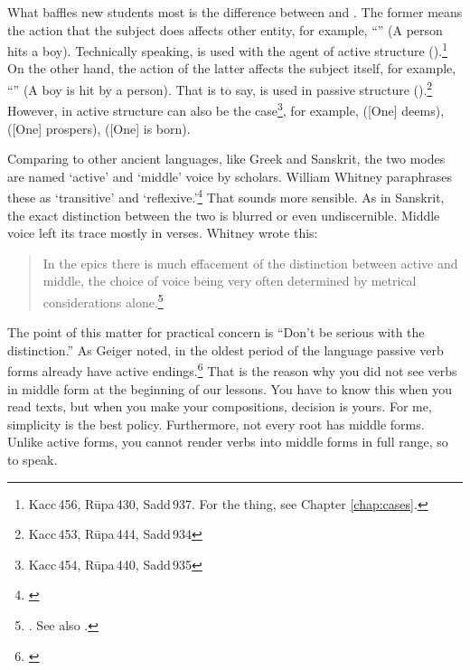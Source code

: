 What baffles new students most is the difference between  and . The former means the action that the subject does affects other entity, for example, ``'' (A person hits a boy). Technically speaking,  is used with the agent of active structure ().\footnote{Kacc\,456, R\=upa\,430, Sadd\,937. For the  thing, see Chapter \ref{chap:cases}.} On the other hand, the action of the latter affects the subject itself, for example, ``'' (A boy is hit by a person). That is to say,  is used in passive structure ().\footnote{Kacc\,453, R\=upa\,444, Sadd\,934} However,  in active structure can also be the case\footnote{Kacc\,454, R\=upa\,440, Sadd\,935}, for example,  ([One] deems),  ([One] prospers),  ([One] is born).

Comparing to other ancient languages, like Greek and Sanskrit, the two modes are named `active' and `middle' voice by scholars. William Whitney paraphrases these as `transitive' and `reflexive.'\footnote{\citealp[\S529:p.~200]{whitney:grammar}} That sounds more sensible. As in Sanskrit, the exact distinction between the two is blurred or even undiscernible. Middle voice left its trace mostly in verses. Whitney wrote this:

\begin{quote}
In the epics there is much effacement of the distinction between active and middle, the choice of voice being very often determined by metrical considerations alone.\footnote{\citealp[\S529:p.~200]{whitney:grammar}. See also \citealp[p.~117]{geiger:grammar}.}
\end{quote}

The point of this matter for practical concern is ``Don't be serious with the distinction.'' As Geiger noted, in the oldest period of the language passive verb forms already have active endings.\footnote{\citealp[p.~117]{geiger:grammar}} That is the reason why you did not see verbs in middle form at the beginning of our lessons. You have to know this when you read texts, but when you make your compositions, decision is yours. For me, simplicity is the best policy. Furthermore, not every root has middle forms. Unlike active forms, you cannot render verbs into middle forms in full range, so to speak.

